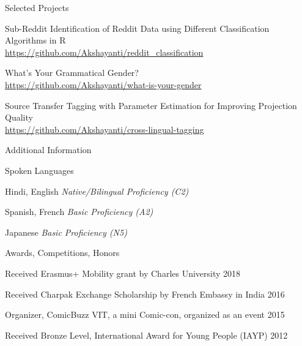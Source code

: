 \documentclass{resume} %
\begin{document}

\begin{rSection}{Selected Projects}

    {Sub-Reddit Identification of Reddit Data using Different Classification Algorithms in R}\\
        \url{https://github.com/Akshayanti/reddit_classification}

    {What's Your Grammatical Gender?}\\
        \url{https://github.com/Akshayanti/what-is-your-gender}

    {Source Transfer Tagging with Parameter Estimation for Improving Projection Quality}\\
        \url{https://github.com/Akshayanti/cross-lingual-tagging}

\end{rSection}


\begin{rSection}{Additional Information}
 
    \begin{rSubsection}{Spoken Languages}{}{}{}
        \item Hindi, English \hfill {\em Native/Bilingual Proficiency (C2)}
        \item Spanish, French \hfill {\em Basic Proficiency (A2)}
        \item Japanese \hfill {\em Basic Proficiency (N5)}
    \end{rSubsection}

    \begin{rSubsection}{Awards, Competitions, Honors}{}{}
    
        \item Received Erasmus+ Mobility grant by Charles University
            \hfill {2018}
        
        \item Received Charpak Exchange Scholarship by French Embassy in India 
            \hfill {2016}
        
        \item {Organizer, ComicBuzz VIT, a mini Comic-con, organized as an 
            event} \hfill {2015}
        
        \item Received Bronze Level, International Award for Young People (IAYP)
            \hfill {2012}
    
    \end{rSubsection}

\end{rSection}
\end{document}
